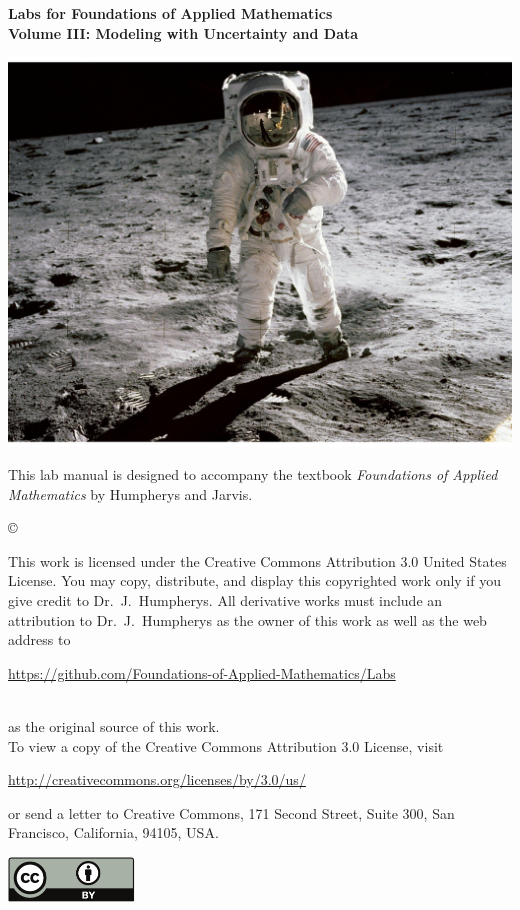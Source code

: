 \documentclass[nociteref]{SIAM-GH-book}
\begin{document}

\thispagestyle{empty} %

\begin{center}
{\huge \bf Labs for Foundations of Applied Mathematics} \\
\vspace{5mm}
{\Large \bf Volume III: Modeling with Uncertainty and Data}
\vspace{20mm}

\includegraphics[scale=.4]{Cover.pdf}
\end{center}
\frontmatter



\begin{thepreface} %

This lab manual is designed to accompany the textbook \emph{Foundations of Applied Mathematics} by Humpherys and Jarvis.

\vfill
\copyright{This work is licensed under the Creative Commons Attribution 3.0 United States
License.  You may copy, distribute, and display this copyrighted work only if you give
credit to Dr.~J.~Humpherys. All derivative works must include an attribution to Dr.~J.~Humpherys as the owner of this work as well as the web address to
\\\centerline{\url{https://github.com/Foundations-of-Applied-Mathematics/Labs}}\\as the original source of this work.
\\To view a copy of the Creative Commons Attribution 3.0 License, visit
\\\centerline{\url{http://creativecommons.org/licenses/by/3.0/us/}} or send a letter to Creative Commons, 171 Second Street, Suite 300, San Francisco, California, 94105, USA.}

\vfill
\centering\includegraphics[height=1.2cm]{by.pdf}
\vfill
\end{thepreface}
\end{document}
